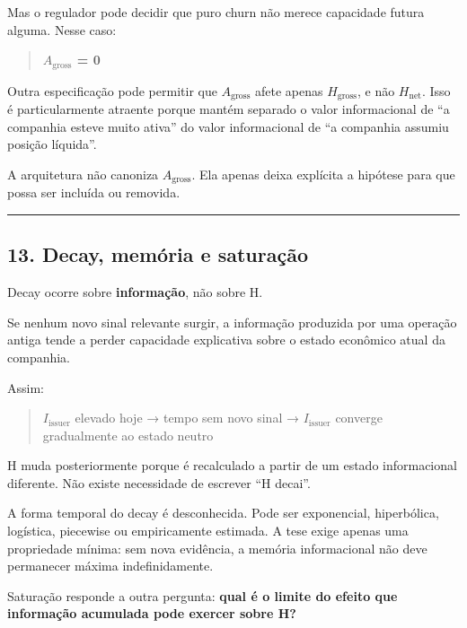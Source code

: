 \documentclass[
  a4paper,
]{article}
\begin{document}
Mas o regulador pode decidir que puro churn não merece capacidade futura
alguma. Nesse caso:

\begin{quote}
\textbf{\(A_{\mathrm{gross}}\) = 0}
\end{quote}

Outra especificação pode permitir que \(A_{\mathrm{gross}}\) afete
apenas \(H_{\mathrm{gross}}\), e não \(H_{\mathrm{net}}\). Isso é
particularmente atraente porque mantém separado o valor informacional de
``a companhia esteve muito ativa'' do valor informacional de ``a
companhia assumiu posição líquida''.

A arquitetura não canoniza \(A_{\mathrm{gross}}\). Ela apenas deixa
explícita a hipótese para que possa ser incluída ou removida.

\begin{center}\rule{0.5\linewidth}{0.5pt}\end{center}

\hypertarget{13-decay-memoria-e-saturacao}{}

\hypertarget{13-decay-memuxf3ria-e-saturauxe7uxe3o}{%
\subsection{13. Decay, memória e
saturação}\label{13-decay-memuxf3ria-e-saturauxe7uxe3o}}

Decay ocorre sobre \textbf{informação}, não sobre H.

Se nenhum novo sinal relevante surgir, a informação produzida por uma
operação antiga tende a perder capacidade explicativa sobre o estado
econômico atual da companhia.

Assim:

\begin{quote}
\(I_{\mathrm{issuer}}\) elevado hoje → tempo sem novo sinal →
\(I_{\mathrm{issuer}}\) converge gradualmente ao estado neutro
\end{quote}

H muda posteriormente porque é recalculado a partir de um estado
informacional diferente. Não existe necessidade de escrever ``H decai''.

A forma temporal do decay é desconhecida. Pode ser exponencial,
hiperbólica, logística, piecewise ou empiricamente estimada. A tese
exige apenas uma propriedade mínima: sem nova evidência, a memória
informacional não deve permanecer máxima indefinidamente.

Saturação responde a outra pergunta: \textbf{qual é o limite do efeito
que informação acumulada pode exercer sobre H?}
\end{document}
